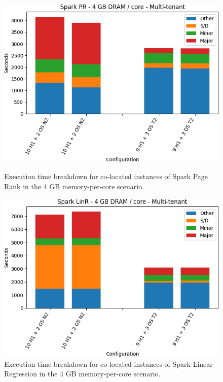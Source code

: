 \begin{figure}[thbp]
\centering
    \includegraphics[width=\linewidth]{./fig/pr32.png}
    \caption{Execution time breakdown for co-located instances of Spark
    Page Rank in the 4 GB memory-per-core scenario.}
    \label{fig:pr32}
        \includegraphics[width=\linewidth]{./fig/linr32.png}
    \caption{Execution time breakdown for co-located instances of Spark
    Linear Regression in the 4 GB memory-per-core scenario.}
    \label{fig:linr32}
\end{figure}

